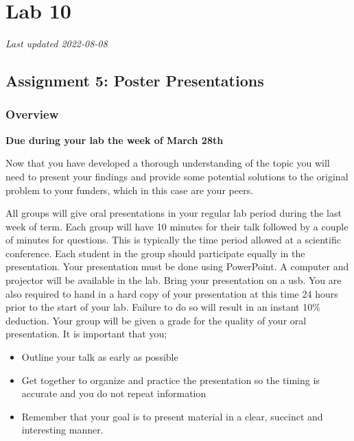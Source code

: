 \documentclass[
]{book}
\providecommand{\tightlist}{%
  \setlength{\itemsep}{0pt}\setlength{\parskip}{0pt}}
\begin{document}
\hypertarget{part-lab-10}{%
\part*{Lab 10}\label{part-lab-10}}

\emph{Last updated 2022-08-08}

\hypertarget{assignment-5-poster-presentations}{%
\chapter*{Assignment 5: Poster Presentations}\label{assignment-5-poster-presentations}}

\hypertarget{overview-2}{%
\section*{Overview}\label{overview-2}}

\textbf{Due during your lab the week of March 28th}

Now that you have developed a thorough understanding of the topic you will need to present your findings and provide some potential solutions to the original problem to your funders, which in this case are your peers.

All groups will give oral presentations in your regular lab period during the last week of term. Each group will have 10 minutes for their talk followed by a couple of minutes for questions. This is typically the time period allowed at a scientific conference. Each student in the group should participate equally in the presentation. Your presentation must be done using PowerPoint. A computer and projector will be available in the lab. Bring your presentation on a usb. You are also required to hand in a hard copy of your presentation at this time 24 hours prior to the start of your lab. Failure to do so will result in an instant 10\% deduction. Your group will be given a grade for the quality of your oral presentation. It is important that you;

\begin{itemize}
\tightlist
\item
  Outline your talk as early as possible
\item
  Get together to organize and practice the presentation so the timing is accurate and you do not repeat information
\item
  Remember that your goal is to present material in a clear, succinct and interesting manner.
\end{itemize}
\end{document}

